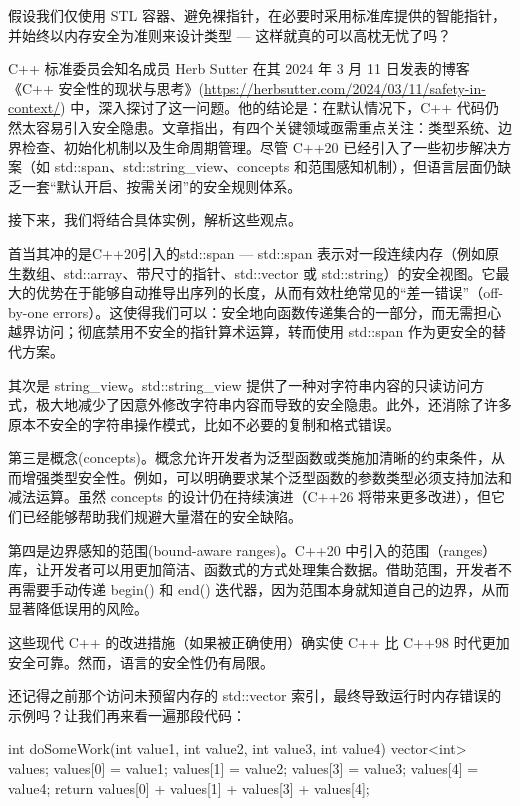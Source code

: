 
假设我们仅使用 STL 容器、避免裸指针，在必要时采用标准库提供的智能指针，并始终以内存安全为准则来设计类型 --- 这样就真的可以高枕无忧了吗？

C++ 标准委员会知名成员 Herb Sutter 在其 2024 年 3 月 11 日发表的博客《C++ 安全性的现状与思考》(\url{https://herbsutter.com/2024/03/11/safety-in-context/}) 中，深入探讨了这一问题。他的结论是：在默认情况下，C++ 代码仍然太容易引入安全隐患。文章指出，有四个关键领域亟需重点关注：类型系统、边界检查、初始化机制以及生命周期管理。尽管 C++20 已经引入了一些初步解决方案（如 std::span、std::string\_view、concepts 和范围感知机制），但语言层面仍缺乏一套“默认开启、按需关闭”的安全规则体系。

接下来，我们将结合具体实例，解析这些观点。

首当其冲的是C++20引入的std::span --- std::span 表示对一段连续内存（例如原生数组、std::array、带尺寸的指针、std::vector 或 std::string）的安全视图。它最大的优势在于能够自动推导出序列的长度，从而有效杜绝常见的“差一错误”（off-by-one errors）。这使得我们可以：安全地向函数传递集合的一部分，而无需担心越界访问；彻底禁用不安全的指针算术运算，转而使用 std::span 作为更安全的替代方案。

其次是 string\_view。std::string\_view 提供了一种对字符串内容的只读访问方式，极大地减少了因意外修改字符串内容而导致的安全隐患。此外，还消除了许多原本不安全的字符串操作模式，比如不必要的复制和格式错误。

第三是概念(concepts)。概念允许开发者为泛型函数或类施加清晰的约束条件，从而增强类型安全性。例如，可以明确要求某个泛型函数的参数类型必须支持加法和减法运算。虽然 concepts 的设计仍在持续演进（C++26 将带来更多改进），但它们已经能够帮助我们规避大量潜在的安全缺陷。

第四是边界感知的范围(bound-aware ranges)。C++20 中引入的范围（ranges）库，让开发者可以用更加简洁、函数式的方式处理集合数据。借助范围，开发者不再需要手动传递 begin() 和 end() 迭代器，因为范围本身就知道自己的边界，从而显著降低误用的风险。

这些现代 C++ 的改进措施（如果被正确使用）确实使 C++ 比 C++98 时代更加安全可靠。然而，语言的安全性仍有局限。

还记得之前那个访问未预留内存的 std::vector 索引，最终导致运行时内存错误的示例吗？让我们再来看一遍那段代码：

\begin{cpp}
int doSomeWork(int value1, int value2, int value3, int value4) {
  vector<int> values;
  values[0] = value1;
  values[1] = value2;
  values[3] = value3;
  values[4] = value4;
  return values[0] + values[1] + values[3] + values[4];
}
\end{cpp}

